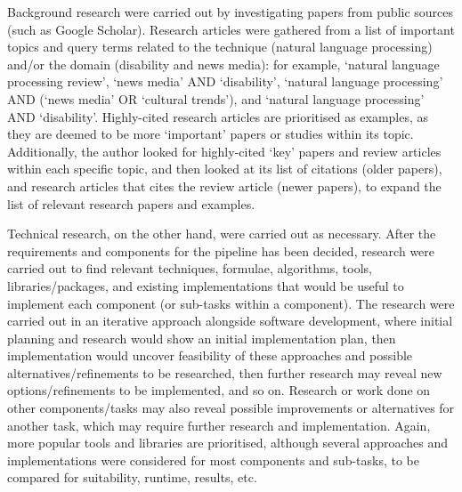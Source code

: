 \documentclass{report}
\begin{document}
Background research were carried out by investigating papers from public sources (such as Google Scholar).
Research articles were gathered from a list of important topics and query terms related to the technique (natural language processing) and/or the domain (disability and news media): for example, `natural language processing review', `news media' AND `disability', `natural language processing' AND (`news media' OR `cultural trends'), and `natural language processing' AND `disability'.
Highly-cited research articles are prioritised as examples, as they are deemed to be more `important' papers or studies within its topic.
Additionally, the author looked for highly-cited `key' papers and review articles within each specific topic, and then looked at its list of citations (older papers), and research articles that cites the review article (newer papers), to expand the list of relevant research papers and examples.

Technical research, on the other hand, were carried out as necessary.
After the requirements and components for the pipeline has been decided, research were carried out to find relevant techniques, formulae, algorithms, tools, libraries/packages, and existing implementations that would be useful to implement each component (or sub-tasks within a component).
The research were carried out in an iterative approach alongside software development, where initial planning and research would show an initial implementation plan, then implementation would uncover feasibility of these approaches and possible alternatives/refinements to be researched, then further research may reveal new options/refinements to be implemented, and so on.
Research or work done on other components/tasks may also reveal possible improvements or alternatives for another task, which may require further research and implementation.  
Again, more popular tools and libraries are prioritised, although several approaches and implementations were considered for most components and sub-tasks, to be compared for suitability, runtime, results, etc.
\end{document}
